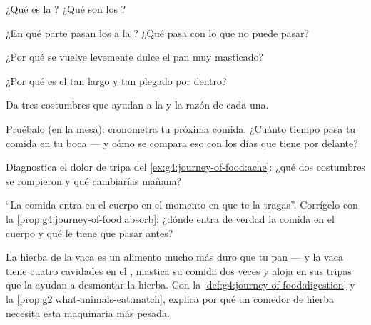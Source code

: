 \begin{exercise}[$\star$]\label{exo:g4:journey-of-food:3}
¿Qué es la ? ¿Qué son los ?
\end{exercise}

\begin{exercise}[$\star$]\label{exo:g4:journey-of-food:4}
¿En qué parte pasan los  a la ? ¿Qué pasa con lo que
no puede pasar?
\end{exercise}

\begin{exercise}[$\star$]\label{exo:g4:journey-of-food:5}
¿Por qué se vuelve levemente dulce el pan muy masticado?
\end{exercise}

\begin{exercise}[$\star$]\label{exo:g4:journey-of-food:6}
¿Por qué es el  tan largo y tan plegado por dentro?
\end{exercise}

\begin{exercise}[$\star$]\label{exo:g4:journey-of-food:7}
Da tres costumbres que ayudan a la  y la razón de cada una.
\end{exercise}

\begin{exercise}[$\star$]\label{exo:g4:journey-of-food:8}
Pruébalo (en la mesa): cronometra tu próxima comida. ¿Cuánto tiempo
pasa tu comida en tu boca --- y cómo se compara eso con los días que
tiene por delante?
\end{exercise}

\begin{exercise}[$\star\star$]\label{exo:g4:journey-of-food:9}
Diagnostica el dolor de tripa del \cref{ex:g4:journey-of-food:ache}:
¿qué dos costumbres se rompieron y qué cambiarías mañana?
\end{exercise}

\begin{exercise}[$\star\star$]\label{exo:g4:journey-of-food:10}
``La comida entra en el cuerpo en el momento en que te la tragas''.
Corrígelo con la \cref{prop:g4:journey-of-food:absorb}: ¿dónde entra
de verdad la comida en el cuerpo y qué le tiene que pasar antes?
\end{exercise}

\begin{exercise}[$\star\star\star$]\label{exo:g4:journey-of-food:11}
La hierba de la vaca es un alimento mucho más duro que tu pan --- y la
vaca tiene cuatro cavidades en el , mastica su comida dos
veces y aloja en sus tripas  que la ayudan a desmontar la
hierba. Con la \cref{def:g4:journey-of-food:digestion} y la
\cref{prop:g2:what-animals-eat:match}, explica por qué un comedor de
hierba necesita esta maquinaria más pesada.
\end{exercise}
